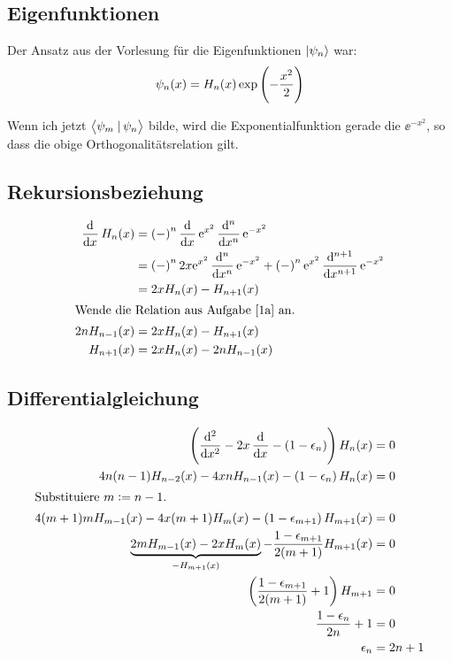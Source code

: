 \subsection{Eigenfunktionen}

Der Ansatz aus der Vorlesung für die Eigenfunktionen $\left| \psi_n \right\rangle$ war:
\[
	\psi_n(x) = H_n(x) \exp\del{-\frac{x^2}2}
\]

Wenn ich jetzt $\braket{\psi_m}{\psi_n}$ bilde, wird die Exponentialfunktion
gerade die $\ee^{-x^2}$, so dass die obige Orthogonalitätsrelation gilt.

\subsection{Rekursionsbeziehung}

\begin{align*}
	\dod{}x H_n(x)
	&= \del-^n \dod{}x \ee^{x^2} \dod[n]{}x \ee^{-x^2} \\
	&= \del-^n 2x \ee^{x^2} \dod[n]{}x \ee^{-x^2} + \del-^n \ee^{x^2} \dod[n+1]{}x \ee^{-x^2} \\
	&= 2x H_n(x) - H_{n+1}(x) \\
	\intertext{%
		Wende die Relation aus Aufgabe \ref{1a} an.
	}
	2n H_{n-1}(x)
	&= 2x H_n(x) - H_{n+1}(x) \\
	H_{n+1}(x)
	&= 2x H_n(x) - 2n H_{n-1}(x)
\end{align*}

\subsection{Differentialgleichung}

\begin{align*}
	\del{\dod[2]{}x - 2x \dod{}x - \del{1-\epsilon_n}} H_n(x) &= 0 \\
	4n(n-1) H_{n-2}(x) - 4xn H_{n-1}(x) - \del{1-\epsilon_n} H_n(x) &= 0 \\
	\intertext{%
		Substituiere $m := n - 1$.
	}
	4(m+1)m H_{m-1}(x) - 4x(m+1) H_{m}(x) - \del{1-\epsilon_{m+1}} H_{m+1}(x) &= 0 \\
	\underbrace{2m H_{m-1}(x) - 2x H_{m}(x)}_{-H_{m+1}(x)} - \frac{1-\epsilon_{m+1}}{2(m+1)} H_{m+1}(x) &= 0 \\
	\del{\frac{1-\epsilon_{m+1}}{2(m+1)} + 1} H_{m+1} &= 0 \\
	\frac{1-\epsilon_n}{2n} + 1 &= 0 \\
	\epsilon_n &= 2n + 1
\end{align*}


\IfFileExists{\bibliographyfile}{
	
}{}



